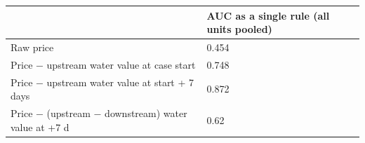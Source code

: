 \begin{tabular}{ll}
\toprule
\textbf{} & \textbf{AUC as a single rule (all units pooled)} \\
\midrule
Raw price & 0.454 \\
Price − upstream water value at case start & 0.748 \\
Price − upstream water value at start + 7 days & 0.872 \\
Price − (upstream − downstream) water value at +7 d & 0.62 \\
\bottomrule
\end{tabular}
